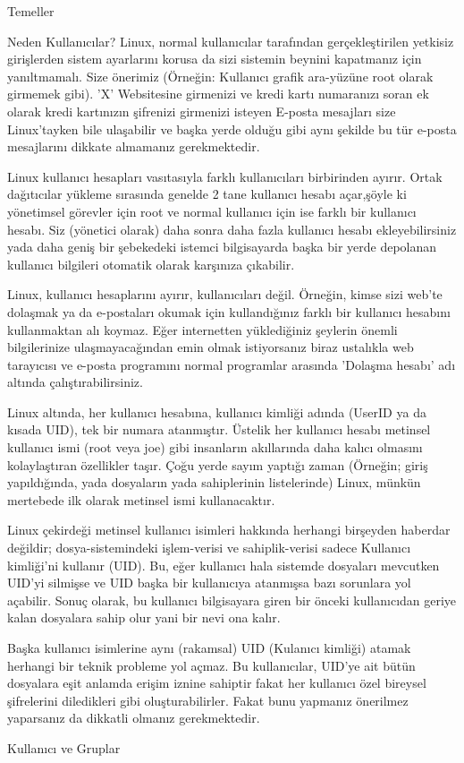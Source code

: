 \begin{section}{Temeller}
\begin{subsection}{Neden Kullanıcılar?}
Linux, normal kullanıcılar tarafından gerçekleştirilen yetkisiz girişlerden sistem ayarlarını korusa da sizi sistemin beynini kapatmanız için yanıltmamalı. Size önerimiz (Örneğin: Kullanıcı grafik ara-yüzüne root olarak girmemek gibi). ’X’ Websitesine girmenizi ve kredi kartı numaranızı soran ek olarak kredi kartınızın şifrenizi girmenizi isteyen E-posta mesajları size Linux'tayken bile ulaşabilir ve başka yerde olduğu gibi aynı şekilde bu tür e-posta mesajlarını dikkate almamanız gerekmektedir.

Linux kullanıcı hesapları vasıtasıyla farklı kullanıcıları birbirinden ayırır. Ortak dağıtıcılar yükleme sırasında genelde 2 tane kullanıcı hesabı açar,şöyle ki yönetimsel görevler için root ve normal kullanıcı için ise farklı bir kullanıcı hesabı. Siz (yönetici olarak) daha sonra daha fazla kullanıcı hesabı ekleyebilirsiniz yada daha geniş bir şebekedeki istemci bilgisayarda başka bir yerde depolanan kullanıcı bilgileri otomatik olarak karşınıza çıkabilir.

Linux, kullanıcı hesaplarını ayırır, kullanıcıları değil. Örneğin, kimse sizi web'te dolaşmak ya da e-postaları okumak için kullandığınız farklı bir kullanıcı hesabını kullanmaktan alı koymaz. Eğer internetten yüklediğiniz şeylerin önemli bilgilerinize ulaşmayacağından emin olmak istiyorsanız biraz ustalıkla web tarayıcısı ve e-posta programını normal programlar arasında 'Dolaşma hesabı' adı altında çalıştırabilirsiniz.

Linux altında, her kullanıcı hesabına, kullanıcı kimliği adında (UserID ya da kısada UID), tek  bir numara atanmıştır. Üstelik her kullanıcı hesabı metinsel kullanıcı ismi (root veya joe) gibi insanların akıllarında daha kalıcı olmasını kolaylaştıran özellikler taşır. Çoğu yerde sayım yaptığı zaman (Örneğin; giriş yapıldığında, yada dosyaların yada sahiplerinin listelerinde) Linux, münkün mertebede ilk olarak metinsel ismi kullanacaktır.

Linux çekirdeği metinsel kullanıcı isimleri hakkında herhangi birşeyden haberdar değildir; dosya-sistemindeki işlem-verisi ve sahiplik-verisi sadece Kullanıcı kimliği'ni kullanır (UID). Bu, eğer kullanıcı hala sistemde dosyaları mevcutken UID’yi silmişse ve UID başka bir kullanıcıya atanmışsa bazı sorunlara yol açabilir. Sonuç olarak, bu kullanıcı bilgisayara giren bir önceki kullanıcıdan geriye kalan dosyalara sahip olur yani bir nevi ona kalır.

Başka kullanıcı isimlerine aynı (rakamsal) UID (Kulanıcı kimliği) atamak herhangi bir teknik probleme yol açmaz. Bu kullanıcılar, UID'ye ait bütün dosyalara eşit anlamda erişim iznine sahiptir fakat her kullanıcı özel bireysel şifrelerini diledikleri gibi oluşturabilirler. Fakat bunu yapmanız önerilmez yaparsanız da dikkatli olmanız gerekmektedir.
\end{subsection}
\begin{subsection}{Kullanıcı ve Gruplar}


\end{subsection}
\end{section}

